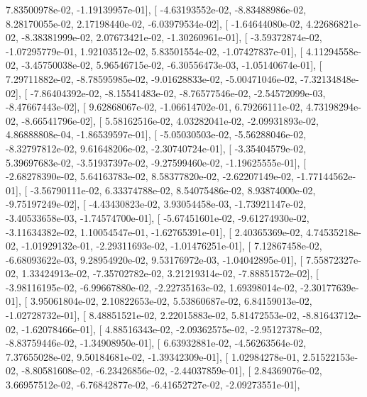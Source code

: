 \documentclass{article}
\begin{document}
          7.83500978e-02,  -1.19139957e-01],
       [ -4.63193552e-02,  -8.83488986e-02,   8.28170055e-02,
          2.17198440e-02,  -6.03979534e-02],
       [ -1.64644080e-02,   4.22686821e-02,  -8.38381999e-02,
          2.07673421e-02,  -1.30260961e-01],
       [ -3.59372874e-02,  -1.07295779e-01,   1.92103512e-02,
          5.83501554e-02,  -1.07427837e-01],
       [  4.11294558e-02,  -3.45750038e-02,   5.96546715e-02,
         -6.30556473e-03,  -1.05140674e-01],
       [  7.29711882e-02,  -8.78595985e-02,  -9.01628833e-02,
         -5.00471046e-02,  -7.32134848e-02],
       [ -7.86404392e-02,  -8.15541483e-02,  -8.76577546e-02,
         -2.54572099e-03,  -8.47667443e-02],
       [  9.62868067e-02,  -1.06614702e-01,   6.79266111e-02,
          4.73198294e-02,  -8.66541796e-02],
       [  5.58162516e-02,   4.03282041e-02,  -2.09931893e-02,
          4.86888808e-04,  -1.86539597e-01],
       [ -5.05030503e-02,  -5.56288046e-02,  -8.32797812e-02,
          9.61648206e-02,  -2.30740724e-01],
       [ -3.35404579e-02,   5.39697683e-02,  -3.51937397e-02,
         -9.27599460e-02,  -1.19625555e-01],
       [ -2.68278390e-02,   5.64163783e-02,   8.58377820e-02,
         -2.62207149e-02,  -1.77144562e-01],
       [ -3.56790111e-02,   6.33374788e-02,   8.54075486e-02,
          8.93874000e-02,  -9.75197249e-02],
       [ -4.43430823e-02,   3.93054458e-03,  -1.73921147e-02,
         -3.40533658e-03,  -1.74574700e-01],
       [ -5.67451601e-02,  -9.61274930e-02,  -3.11634382e-02,
          1.10054547e-01,  -1.62765391e-01],
       [  2.40365369e-02,   4.74535218e-02,  -1.01929132e-01,
         -2.29311693e-02,  -1.01476251e-01],
       [  7.12867458e-02,  -6.68093622e-03,   9.28954920e-02,
          9.53176972e-03,  -1.04042895e-01],
       [  7.55872327e-02,   1.33424913e-02,  -7.35702782e-02,
          3.21219314e-02,  -7.88851572e-02],
       [ -3.98116195e-02,  -6.99667880e-02,  -2.22735163e-02,
          1.69398014e-02,  -2.30177639e-01],
       [  3.95061804e-02,   2.10822653e-02,   5.53860687e-02,
          6.84159013e-02,  -1.02728732e-01],
       [  8.48851521e-02,   2.22015883e-02,   5.81472553e-02,
         -8.81643712e-02,  -1.62078466e-01],
       [  4.88516343e-02,  -2.09362575e-02,  -2.95127378e-02,
         -8.83759446e-02,  -1.34908950e-01],
       [  6.63932881e-02,  -4.56263564e-02,   7.37655028e-02,
          9.50184681e-02,  -1.39342309e-01],
       [  1.02984278e-01,   2.51522153e-02,  -8.80581608e-02,
         -6.23426856e-02,  -2.44037859e-01],
       [  2.84369076e-02,   3.66957512e-02,  -6.76842877e-02,
         -6.41652727e-02,  -2.09273551e-01],
\end{document}
